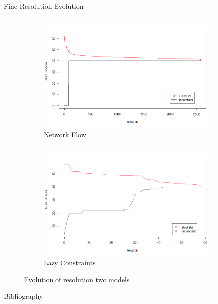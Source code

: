 \documentclass{beamer}
\begin{document}
\begin{frame}{Fine Resolution Evolution}
    \begin{figure}
    \begin{subfigure}{.5\textwidth}
      \centering
      \includegraphics[width=1\linewidth]{figures/res2paper.png}
      \caption{Network Flow}
      \label{fig:sfig1}
    \end{subfigure}%
    \begin{subfigure}{.5\textwidth}
      \centering
      \includegraphics[width=1\linewidth]{figures/res2lazy.png}
      \caption{Lazy Constraints}
      \label{fig:sfig2}
    \end{subfigure}
    \caption{Evolution of resolution two models}
    \label{fig:fig}
    \end{figure}
\end{frame}

\begin{frame}{Bibliography}
    
    
\end{frame}
\end{document}
